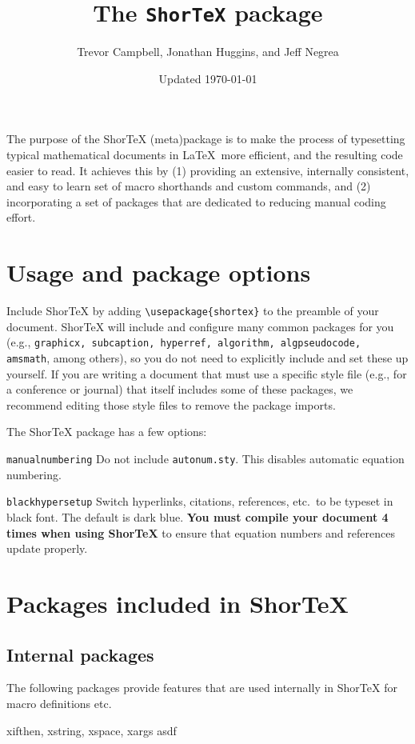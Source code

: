 \documentclass{article}
\title{The \texttt{ShorTeX} package}
\author{Trevor Campbell, Jonathan Huggins, and Jeff Negrea}
\date{Updated \today}
\begin{document}
\maketitle


\babs
The purpose of the ShorTeX (meta)package is to make the process of typesetting
typical mathematical documents in \LaTeX~more efficient, and the resulting
code easier to read.  It achieves this by 
(1) providing an
extensive, internally consistent, and easy to learn set of macro
shorthands and custom commands, and 
(2) incorporating a set of packages that are
dedicated to reducing manual coding effort.
\eabs


\tableofcontents

\section{Usage and package options}\label{sec:usage}


Include ShorTeX by adding \verb!\usepackage{shortex}! to the preamble of your document.
ShorTeX will include and configure many common packages for you (e.g., \texttt{graphicx, subcaption, hyperref, algorithm, algpseudocode, amsmath}, among others),
so you do not need to explicitly include and set these up yourself.
If you are writing a document that must use a specific style file (e.g., for a conference or journal) that itself
includes some of these packages, we recommend editing those style files to remove the package imports.

The ShorTeX package has a few options:
\bdesc
\item[\texttt{manualnumbering}] Do not include \texttt{autonum.sty}. This disables automatic equation numbering.
\item[\texttt{blackhypersetup}] Switch hyperlinks, citations, references, etc.~to be typeset in black font. The default is dark blue.
\edesc
\textbf{You must compile your document 4 times when using ShorTeX} to ensure that equation
numbers and references update properly.

\section{Packages included in ShorTeX}
\subsection{Internal packages}
The following packages provide features that are used internally in ShorTeX for 
macro definitions etc.
\bdesc
\item[xifthen, xstring, xspace, xargs] asdf
\edesc
\end{document}
